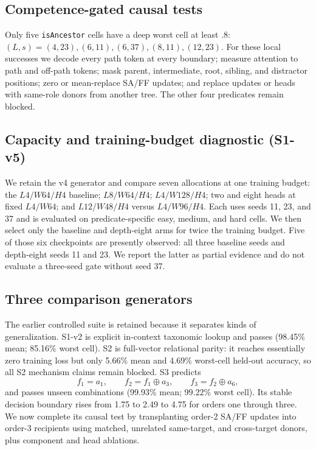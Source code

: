 \documentclass[10pt]{article}
\begin{document}
\subsection{Competence-gated causal tests}
Only five \texttt{isAncestor} cells have a deep worst cell at least .8: $(L,s)=(4,23),(6,11),(6,37),(8,11),(12,23)$. For these local successes we decode every path token at every boundary; measure attention to path and off-path tokens; mask parent, intermediate, root, sibling, and distractor positions; zero or mean-replace SA/FF updates; and replace updates or heads with same-role donors from another tree. The other four predicates remain blocked.

\subsection{Capacity and training-budget diagnostic (S1-v5)}
We retain the v4 generator and compare seven allocations at one training budget: the $L4/W64/H4$ baseline; $L8/W64/H4$; $L4/W128/H4$; two and eight heads at fixed $L4/W64$; and $L12/W48/H4$ versus $L4/W96/H4$. Each uses seeds 11, 23, and 37 and is evaluated on predicate-specific easy, medium, and hard cells. We then select only the baseline and depth-eight arms for twice the training budget. Five of those six checkpoints are presently observed: all three baseline seeds and depth-eight seeds 11 and 23. We report the latter as partial evidence and do not evaluate a three-seed gate without seed 37.

\subsection{Three comparison generators}
The earlier controlled suite is retained because it separates kinds of generalization. S1-v2 is explicit in-context taxonomic lookup and passes (98.45\% mean; 85.16\% worst cell). S2 is full-vector relational parity: it reaches essentially zero training loss but only 5.66\% mean and 4.69\% worst-cell held-out accuracy, so all S2 mechanism claims remain blocked. S3 predicts
\[f_1=a_1,\qquad f_2=f_1\oplus a_3,\qquad f_3=f_2\oplus a_6,
\]
and passes unseen combinations (99.93\% mean; 99.22\% worst cell). Its stable decision boundary rises from 1.75 to 2.49 to 4.75 for orders one through three. We now complete its causal test by transplanting order-2 SA/FF updates into order-3 recipients using matched, unrelated same-target, and cross-target donors, plus component and head ablations.
\end{document}
